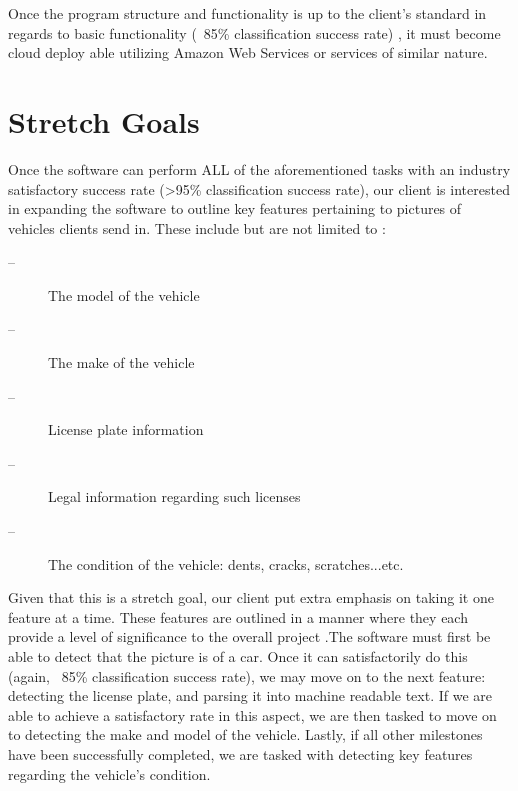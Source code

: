 \documentclass[onecolumn, draftclsnofoot,10pt, compsoc]{IEEEtran}
\begin{document}
Once the program structure and functionality is up to the client's standard in regards to basic functionality (~85\% classification success rate) , it must become cloud deploy able utilizing Amazon Web Services or services of similar nature. 

\section{Stretch Goals}
	
	Once the software can perform ALL of the aforementioned tasks with an industry satisfactory success rate (>95\% classification success rate), our client is interested in expanding the software to outline key features pertaining to pictures of vehicles clients send in. These include but are not limited to :
\begin{description}
	\item[--]The model of the vehicle
	\item[--]The make of the vehicle 
	\item[--]License plate information
	\item[--]Legal information regarding such licenses
	\item[--]The condition of the vehicle: dents, cracks, scratches...etc.
\end{description}

Given that this is a stretch goal, our client put extra emphasis on taking it one feature at a time. These features are outlined in a manner where they each provide a level of significance to the overall project .The software must first be able to detect that the picture is of a car.  Once it can satisfactorily do this (again, ~85\% classification success rate), we may move on to the next feature: detecting the license plate, and parsing it into machine readable text. If we are able to achieve a satisfactory rate in this aspect, we are then tasked to move on to detecting the make and model of the vehicle. Lastly, if all other milestones have been successfully completed, we are tasked with detecting key features regarding the vehicle's condition. 
\end{document}
